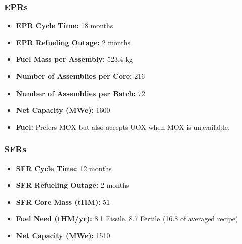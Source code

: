 \subsubsection{\gls{EPR}s}
\begin{itemize}
	\item \textbf{EPR Cycle Time:} 18 months  
	\item \textbf{EPR Refueling Outage:} 2 months  
	\item \textbf{Fuel Mass per Assembly:} 523.4 kg  
	\item \textbf{Number of Assemblies per Core:} 216   
	\item \textbf{Number of Assemblies per Batch:} 72
	\item \textbf{Net Capacity (MWe):} 1600
	\item \textbf{Fuel:} Prefers \gls{MOX} but also accepts \gls{UOX} when \gls{MOX} is unavailable.
\end{itemize}

\subsubsection{\gls{SFR}s}

\begin{itemize}
	\item \textbf{SFR Cycle Time:} 12 months 
	\item \textbf{SFR Refueling Outage:} 2 months
	\item \textbf{SFR Core Mass (tHM):} 51
	\item \textbf{Fuel Need (tHM/yr): } 8.1 Fissile, 8.7 Fertile (16.8 of averaged recipe)
	\item \textbf{Net Capacity (MWe):} 1510
\end{itemize}

